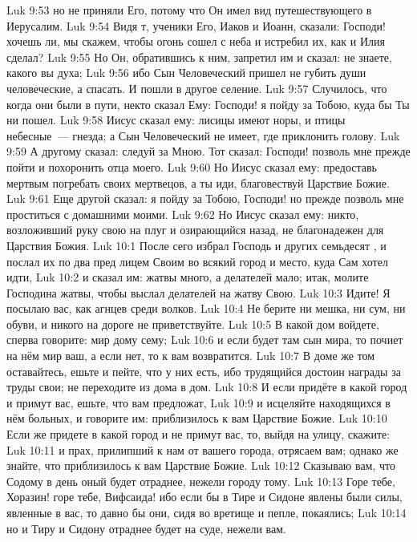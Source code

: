 \vs Luk 9:53 но  не приняли Его, потому что Он имел вид путешествующего в Иерусалим.
\vs Luk 9:54 Видя т, ученики Его, Иаков и Иоанн, сказали: Господи! хочешь ли, мы скажем, чтобы огонь сошел с неба и истребил их, как и Илия сделал?
\vs Luk 9:55 Но Он, обратившись к ним, запретил им и сказал: не знаете, какого вы духа;
\vs Luk 9:56 ибо Сын Человеческий пришел не губить души человеческие, а спасать. И пошли в другое селение.
\rsbpar\vs Luk 9:57 Случилось, что когда они были в пути, некто сказал Ему: Господи! я пойду за Тобою, куда бы Ты ни пошел.
\vs Luk 9:58 Иисус сказал ему: лисицы имеют норы, и птицы небесные~--- гнезда; а Сын Человеческий не имеет, где приклонить голову.
\vs Luk 9:59 А другому сказал: следуй за Мною. Тот сказал: Господи! позволь мне прежде пойти и похоронить отца моего.
\vs Luk 9:60 Но Иисус сказал ему: предоставь мертвым погребать своих мертвецов, а ты иди, благовествуй Царствие Божие.
\vs Luk 9:61 Еще другой сказал: я пойду за Тобою, Господи! но прежде позволь мне проститься с домашними моими.
\vs Luk 9:62 Но Иисус сказал ему: никто, возложивший руку свою на плуг и озирающийся назад, не благонадежен для Царствия Божия.
\vs Luk 10:1 После сего избрал Господь и других семьдесят , и послал их по два пред лицем Своим во всякий город и место, куда Сам хотел идти,
\vs Luk 10:2 и сказал им: жатвы много, а делателей мало; итак, молите Господина жатвы, чтобы выслал делателей на жатву Свою.
\vs Luk 10:3 Идите! Я посылаю вас, как агнцев среди волков.
\vs Luk 10:4 Не берите ни мешка, ни сум, ни обуви, и никого на дороге не приветствуйте.
\vs Luk 10:5 В какой дом войдете, сперва говорите: мир дому сему;
\vs Luk 10:6 и если будет там сын мира, то почиет на нём мир ваш, а если нет, то к вам возвратится.
\vs Luk 10:7 В доме же том оставайтесь, ешьте и пейте, что у них есть, ибо трудящийся достоин награды за труды свои; не переходите из дома в дом.
\vs Luk 10:8 И если придёте в какой город и примут вас, ешьте, что вам предложат,
\vs Luk 10:9 и исцеляйте находящихся в нём больных, и говорите им: приблизилось к вам Царствие Божие.
\vs Luk 10:10 Если же придете в какой город и не примут вас, то, выйдя на улицу, скажите:
\vs Luk 10:11 и прах, прилипший к нам от вашего города, отрясаем вам; однако же знайте, что приблизилось к вам Царствие Божие.
\vs Luk 10:12 Сказываю вам, что Содому в день оный будет отраднее, нежели городу тому.
\vs Luk 10:13 Горе тебе, Хоразин! горе тебе, Вифсаида! ибо если бы в Тире и Сидоне явлены были силы, явленные в вас, то давно бы они, сидя во вретище и пепле, покаялись;
\vs Luk 10:14 но и Тиру и Сидону отраднее будет на суде, нежели вам.

